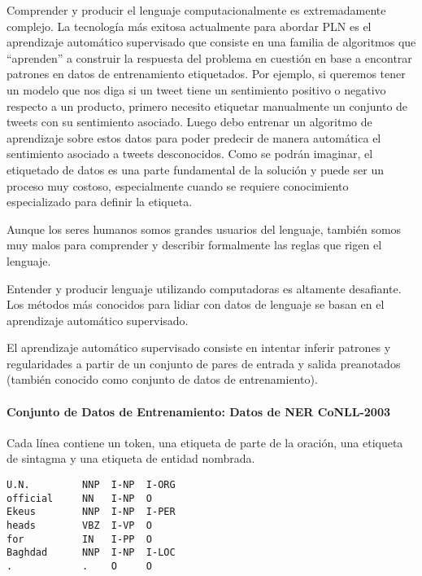 Comprender y producir el lenguaje computacionalmente es extremadamente complejo.  La tecnología más exitosa actualmente para abordar PLN es el aprendizaje automático supervisado que consiste en una familia de algoritmos que “aprenden” a construir la respuesta del problema en cuestión en base a encontrar patrones en datos de entrenamiento etiquetados. Por ejemplo, si queremos tener un modelo que nos diga si un tweet tiene un sentimiento positivo o negativo respecto a un producto, primero necesito  etiquetar manualmente un conjunto de tweets con su sentimiento asociado. Luego debo entrenar un algoritmo de aprendizaje sobre estos datos para poder predecir de manera automática el sentimiento asociado a tweets desconocidos. Como se podrán imaginar, el etiquetado de datos es una parte fundamental de la solución y puede ser un proceso muy costoso, especialmente cuando se requiere conocimiento especializado para definir la etiqueta.

Aunque los seres humanos somos grandes usuarios del lenguaje, también somos muy malos para comprender y describir formalmente las reglas que rigen el lenguaje.

Entender y producir lenguaje utilizando computadoras es altamente desafiante. Los métodos más conocidos para lidiar con datos de lenguaje se basan en el aprendizaje automático supervisado.

El aprendizaje automático supervisado consiste en intentar inferir patrones y regularidades a partir de un conjunto de pares de entrada y salida preanotados (también conocido como conjunto de datos de entrenamiento).

\paragraph{Conjunto de Datos de Entrenamiento: Datos de NER CoNLL-2003}

Cada línea contiene un token, una etiqueta de parte de la oración, una etiqueta de sintagma y una etiqueta de entidad nombrada.
\begin{center}
\begin{verbatim}
U.N.         NNP  I-NP  I-ORG
official     NN   I-NP  O
Ekeus        NNP  I-NP  I-PER
heads        VBZ  I-VP  O
for          IN   I-PP  O
Baghdad      NNP  I-NP  I-LOC
.            .    O     O
\end{verbatim}
\end{center}


